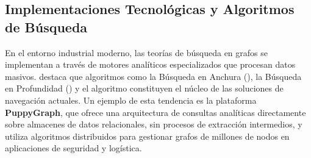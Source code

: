\subsection{Implementaciones Tecnológicas y Algoritmos de Búsqueda}
\label{subsec:implementaciones-grafos}
    En el entorno industrial moderno, las teorías de búsqueda en grafos se implementan a través de motores
    analíticos especializados que procesan datos masivos. \textcite{wang2025} destaca que algoritmos como la
    Búsqueda en Anchura (), la Búsqueda en Profundidad () y el algoritmo 
    constituyen el núcleo de las soluciones de navegación actuales. Un ejemplo de esta tendencia es la plataforma
    \textbf{PuppyGraph}, que ofrece una arquitectura de consultas analíticas directamente sobre almacenes de datos
    relacionales, sin procesos de extracción intermedios, y utiliza algoritmos distribuidos para gestionar grafos
    de millones de nodos en aplicaciones de seguridad y logística.
